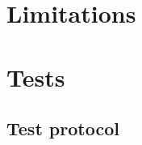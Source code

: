 \documentclass[titlepage, twocolumn, a4paper, 10pt]{article}
\begin{document}


\section{Limitations}\label{sec:limitations}


\section{Tests}\label{sec:tests}




\subsection{Test protocol}\label{sec:test-protocol}
\end{document}
